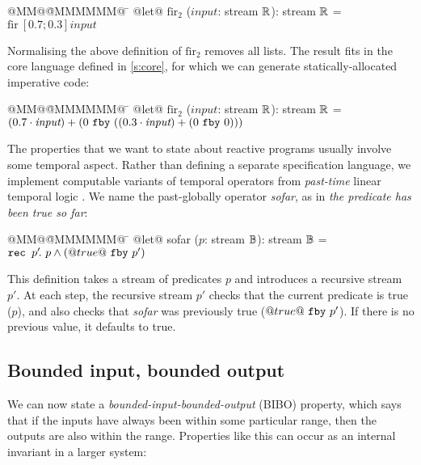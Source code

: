 \documentclass[sigplan,screen, review]{acmart}
\begin{document}
\newcommand\bibo{\mbox{bibo}}
\newcommand\fir{\mbox{fir}}
\newcommand\ii{\textit{input}}
\newcommand\oo{\textit{output}}
\newcommand\ok{\textit{ok}}
\begin{tabbing}
  @MM@\= @MMMMMM@ \= \kill
  @let@ $\mbox{fir}_2$ ($\ii$: stream $\mathbb{R}$): stream $\mathbb{R}$ = \\
    \> $\mbox{fir}~[0.7; 0.3] \ii$
\end{tabbing}

Normalising the above definition of $\mbox{fir}_2$ removes all lists.
The result fits in the core language defined in \autoref{s:core}, for which we can generate statically-allocated imperative code:

\begin{tabbing}
    @MM@\= @MMMMMM@ \= \kill
      @let@ $\mbox{fir}_2$ ($\ii$: stream $\mathbb{R}$): stream $\mathbb{R}$ = \\
    \> $(0.7 \cdot \ii) + (\xfby{0}{((0.3 \cdot \ii) + (\xfby{0}{0}))})$
\end{tabbing}

The properties that we want to state about reactive programs usually involve some temporal aspect.
Rather than defining a separate specification language, we implement computable variants of temporal operators from \emph{past-time} linear temporal logic \cite{halbwachs1993executable,lichtenstein1985glory}.
We name the past-globally operator \emph{sofar}, as in \emph{the predicate has been true so far}:

\begin{tabbing}
  @MM@\= @MMMMMM@ \= \kill
  @let@ sofar ($p$: stream $\mathbb{B}$): stream $\mathbb{B}$ = \\
    \> $\texttt{rec~} p' \!.~p \wedge (@true@~\texttt{fby}~p')$
\end{tabbing}

This definition takes a stream of predicates $p$ and introduces a recursive stream $p'$.
At each step, the recursive stream $p'$ checks that the current predicate is true ($p$), and also checks that \emph{sofar} was previously true ($@true@~\texttt{fby}~p'$).
If there is no previous value, it defaults to true.

\subsection{Bounded input, bounded output}
\label{ss:tut:bibo}
We can now state a \emph{bounded-input-bounded-output} (BIBO) property, which says that if the inputs have always been within some particular range, then the outputs are also within the range.
Properties like this can occur as an internal invariant in a larger system:
\end{document}
